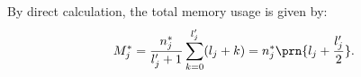 
By direct calculation, the total memory usage  is given by:
\begin{equation}
    M_j^* = \frac{n_j^*}{l_j^{\prime}+1}\sum_{k=0}^{l_j^{\prime}}(l_j+k) = n_j^*\prn{l_j+\frac{l_j'}{2}}.
\end{equation}


